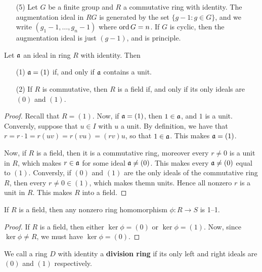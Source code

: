 \begin{example}
\begin{enumerate}
    \item[(5)] Let $G$ be a finite group and  $R$ a commutative ring with
      identity. The augmentation ideal in $RG$ is generated by the set
      $\{g-1 : g \in G\}$, and we write $(g_1-1, \dots, g_n-1)$ where
      $\operatorname{ord}{G}=n$. If $G$ is cyclic, then the augmentation ideal is just
      $(g-1)$, and is principle.
  \end{enumerate}
\end{example}

\begin{lemma}\label{lemma_5.4.1}
  Let $\mathfrak{a}$ an ideal in ring $R$ with identity. Then
  \begin{enumerate}
    \item[(1)] $\mathfrak{a}=(1)$ if, and only if $\mathfrak{a}$ contains a unit.

    \item[(2)] If $R$ is commutative, then $R$ is a field if, and only if
      its only ideals are $(0)$ and $(1)$.
  \end{enumerate}
\end{lemma}
\begin{proof}
  Recall that $R=(1)$. Now, if $\mathfrak{a}=(1)$, then $1 \in \mathfrak{a}$, and  $1$ is a unit.
  Conversly, suppose that $u \in I$ with $u$ a unit. By definition, we have
  that  $r=r \cdot 1=r(uv)=r(vu)=(rv)u$, so that $1 \in \mathfrak{a}$. This makes
  $\mathfrak{a}=(1)$.

  Now, if $R$ is a field, then it is a commutative ring, moreover every  $r
  \neq 0$ is a unit in $R$, which makes $r \in \mathfrak{a}$ for some ideal
  $\mathfrak{a} \neq (0)$. This makes every $\mathfrak{a} \neq (0)$ equal to $(1)$. Conversly,
  if $(0)$ and $(1)$ are the only ideals of the commutative ring $R$, then
  every $r \neq 0 \in (1)$, which makes themn units. Hence all nonzero $r$ is a
  unit in $R$. This makes $R$ into a field.
\end{proof}
\begin{corollary}
  If $R$ is a field, then any nonzero ring homomorphism $\phi:R \xrightarrow{}
  S$ is 1--1.
\end{corollary}
\begin{proof}
  If $R$ is a field, then either $\ker{\phi}=(0)$ or $\ker{\phi}=(1)$. Now,
  since $\ker{\phi} \neq R$, we must have $\ker{\phi}=(0)$.
\end{proof}

\begin{definition}
  We call a ring $D$ with identity a \textbf{division ring} if its only left
  and right ideals are $(0)$ and $(1)$ respectively.
\end{definition}

